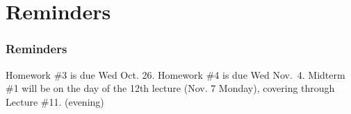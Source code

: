 \documentclass[11pt]{beamer}
\begin{document}
\section{Reminders}

\begin{frame}
  \frametitle{Reminders}
  \Enlarge

  \begin{itemize}
  \myitem  Homework \#3 is due Wed Oct. 26.
  \myitem  Homework \#4 is due Wed Nov.\ 4.
  \myitem Midterm \#1 will be on the day of the 12th lecture (Nov. 7 Monday), covering through Lecture \#11. (evening)
  \end{itemize}
\end{frame}
\end{document}
